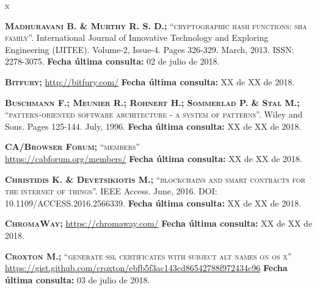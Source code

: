\begin{thebibliography} {x}
				
	 \textsc{\textbf{Madhuravani B. \& Murthy R. S. D.; }}\textsc{“cryptographic hash functions: sha family”.} International Journal of Innovative Technology and Exploring Engineering (IJITEE). Volume-2, Issue-4. Pages 326-329. March, 2013. ISSN: 2278-3075.
	\newline \textbf{Fecha última consulta:} 02 de julio de 2018.
		
	 \textsc{\textbf{Bitfury; }} 
	\url{http://bitfury.com/}
	\newline \textbf{Fecha última consulta:} XX de XX de 2018.
		
	 \textsc{\textbf{Buschmann F.; Meunier R.; Rohnert H.; Sommerlad P. \& Stal M.; }}\textsc{“pattern-oriented software architecture - a system of patterns”.} Wiley and Sons. Pages 125-144. July, 1996.
	\newline \textbf{Fecha última consulta:} XX de XX de 2018.
		
	 \textsc{\textbf{CA/Browser Forum; }}\textsc{“members”} \\ 
	\url{https://cabforum.org/members/}
	\newline \textbf{Fecha última consulta:} XX de XX de 2018.
		
	 \textsc{\textbf{Christidis K. \& Devetsikiotis M.; }}\textsc{“blockchains and smart contracts for the internet of things”.} IEEE Access. June, 2016. DOI: 10.1109/ACCESS.2016.2566339. 
	\newline \textbf{Fecha última consulta:} {\color{red}XX de XX de 2018.}
	
	 \textsc{\textbf{ChromaWay; }} 
	\url{https://chromaway.com/}
	\newline \textbf{Fecha última consulta:} XX de XX de 2018.
	
	 \textsc{\textbf{Croxton M.; }}\textsc{“generate ssl certificates with subject alt names on os x”} \\ 
	\url{https://gist.github.com/croxton/ebfb5f3ac143cd86542788f972434c96}
	\newline \textbf{Fecha última consulta:} 03 de julio de 2018.
		

\end{thebibliography}
